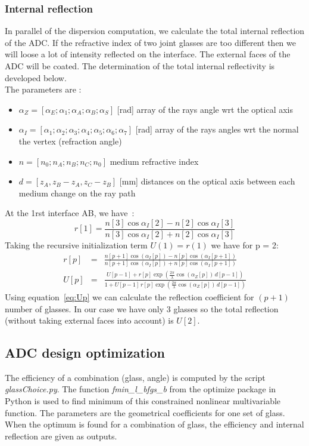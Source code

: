 \subsubsection{Internal reflection}
In parallel of the dispersion computation, we calculate the total internal reflection of the ADC. If the refractive index of two joint glasses are too different then we will loose a lot of intensity reflected on the interface. The external faces of the ADC will be coated. The determination of the total internal reflectivity is developed below.\\
The parameters are :
\begin{itemize}
	\item $\alpha_Z = [\alpha_E;\alpha_1;\alpha_A;\alpha_B;\alpha_S]$ [rad] array of the rays angle wrt the optical axis
	\item $\alpha_I = [\alpha_1;\alpha_2;\alpha_3;\alpha_4;\alpha_5;\alpha_6;\alpha_7]$ [rad] array of the rays angles wrt the normal the vertex (refraction angle)
	\item $n = [n_0;n_A;n_B;n_C;n_0]$ medium refractive index
	\item $d = [z_A,z_B-z_A,z_C-z_B]$ [mm] distances on the optical axis between each medium change on the ray path
\end{itemize}

At the 1rst interface AB, we have~\cite{app:wiki_CoefficientsFresnel}:
\begin{equation}
	r[1] = \frac{n[3]\cos\alpha_I[2]-n[2]\cos\alpha_I[3]}{n[3]\cos\alpha_I[2]+n[2]\cos\alpha_I[3]}
\end{equation}
Taking the recursive initialization term $U(1) = r(1)$ we have for p = 2:\\
\begin{eqnarray}
	r[p] &= &\frac{n[p+1]\cos\left(\alpha_I[p]\right)-n[p]\cos\left(\alpha_I[p+1]\right)}{n[p+1]\cos\left(\alpha_I[p]\right)+n[p]\cos\left(\alpha_I[p+1]\right)}\\
	U[p] &= &\frac{U[p-1]+r[p]\exp\left(\frac{2\pi}{\lambda}\cos\left(\alpha_Z[p]\right)\,d[p-1]\right)}{1+U[p-1]\,r[p]\exp\left(\frac{2\pi}{\lambda}\cos\left(\alpha_Z[p]\right)\,d[p-1]\right)}\label{eq:Up}
\end{eqnarray}
Using equation~\eqref{eq:Up} we can calculate the reflection coefficient for $(p+1)$ number of glasses. In our case we have only 3 glasses so the total reflection (without taking external faces into account) is $U[2]$.

\subsection{ADC design optimization}
The efficiency of a combination (glass, angle) is computed by the script \textit{glassChoice.py}. The function \textit{fmin\_l\_bfgs\_b} from the optimize package in Python is used to find minimum of this constrained nonlinear multivariable function. The parameters are the geometrical coefficients for one set of glass. When the optimum is found for a combination of glass, the efficiency and internal reflection are given as outputs.\\

